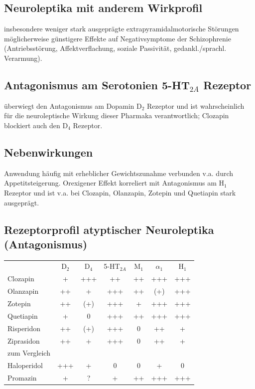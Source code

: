 \documentclass[10pt,a4paper]{report}
\begin{document}
\subsection{Neuroleptika mit anderem Wirkprofil} %
\label{sub:neuroleptika_mit_anderem_wirkprofil}
insbesondere weniger stark ausgeprägte extrapyramidalmotorische Störungen möglicherweise günstigere Effekte auf Negativsymptome der Schizophrenie (Antriebsstörung, Affektverflachung, soziale Passivität, gedankl./sprachl. Verarmung).
\subsection{Antagonismus am Serotonien 5-HT$_{2A}$ Rezeptor} %
\label{sub:antagonismus_am_serotonien_5_ht__}
überwiegt den Antagonismus am Dopamin D$_2$ Rezeptor und ist wahrscheinlich für die neuroleptische Wirkung dieser Pharmaka verantwortlich; Clozapin blockiert auch den D$_4$ Rezeptor.
\subsection{Nebenwirkungen} %
\label{sub:nebenwirkungen}
Anwendung häufig mit erheblicher Gewichtszunahme verbunden v.a. durch Appetitsteigerung. Orexigener Effekt korreliert mit Antagonismus am H$_1$ Rezeptor und ist v.a. bei Clozapin, Olanzapin, Zotepin und Quetiapin stark ausgeprägt.
\subsection{Rezeptorprofil atyptischer Neuroleptika (Antagonismus)} %
\label{sub:rezeptorprofil_atyptischer_neuroleptika_}
\begin{tabularx}{\textwidth}{lcccccc}
&D$_2$&D$_4$&5-HT$_{2A}$&M$_1$&$\alpha_1$&H$_1$\\	
Clozapin&+&+++&++&++&+++&+++\\
Olanzapin&++&+&+++&++&(+)&+++\\
Zotepin&++&(+)&+++&+&+++&+++\\
Quetiapin&+&0&+++&++&+++&+++\\
Risperidon&++&(+)&+++&0&++&+\\
Ziprasidon&++&+&+++&0&++&+\\
zum Vergleich\\
Haloperidol&+++&+&0&0&+&0\\
Promazin&+&?&+&++&+++&+++\\
\end{tabularx}
\end{document}
